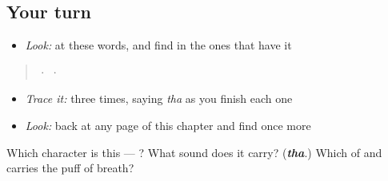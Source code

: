 \subsection*{Your turn}
\begin{itemize}
\raggedright
  \item \emph{Look:} at these words, and find  in the ones that have it
\end{itemize}

\begin{quote}
  ·    ·  
\end{quote}

\begin{itemize}
\raggedright
  \item \emph{Trace it:}  three times, saying \emph{tha} as you finish each one
  \item \emph{Look:} back at any page of this chapter and find  once more
\end{itemize}

\begin{tcolorbox}[breakable,colback=teal!4,colframe=teal!35!black,title={Before you move on}]
Which character is this — ? What sound does it carry? (\emph{\textbf{tha}}.) Which of  and  carries the puff of breath?
\end{tcolorbox}
